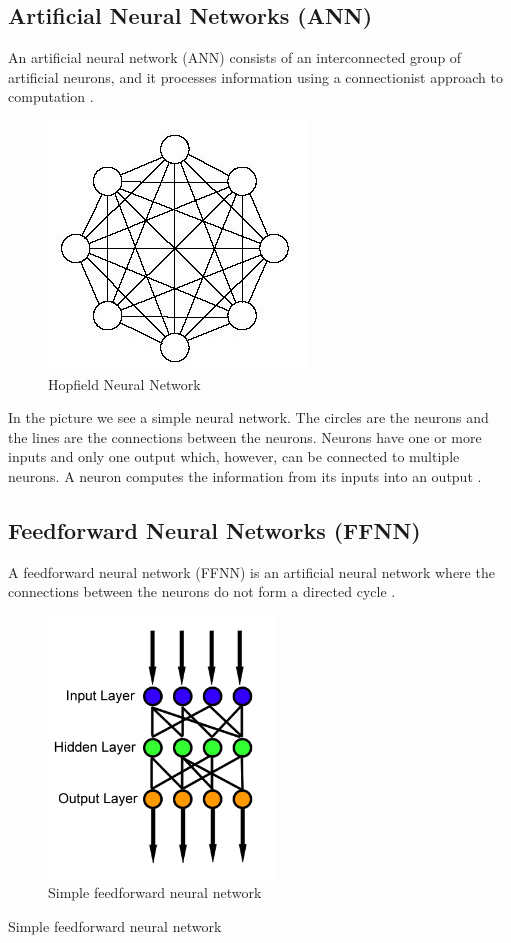 \subsection{Artificial Neural Networks (ANN)}
\label{sec:ann}

An artificial neural network (ANN) consists of an interconnected group of artificial neurons, and it processes information using a connectionist approach to computation \cite{wiki:nn}.



\begin{figure}[h]
  \centering
  \includegraphics{hopfig}

  \caption{Hopfield Neural Network}
  \label{fig:hopfield}
\end{figure}



In the picture we see a simple neural network. The circles are the neurons and the lines are the connections between the neurons. Neurons have one or more inputs and only one output which, however, can be connected to multiple neurons. A neuron computes the information from its inputs into an output \cite{wiki:nn} . 

\subsection{Feedforward Neural Networks (FFNN)}
\label{sec:ffnn}

A feedforward neural network (FFNN) is an artificial neural network where the connections between the neurons do not form a directed cycle \cite{wiki:ffnn}.

\begin{figure}[h]
  \centering
  \includegraphics[width=6cm,keepaspectratio=true]{ffnn}
  \caption{Simple feedforward neural network}
\end{figure}
Simple feedforward neural network


